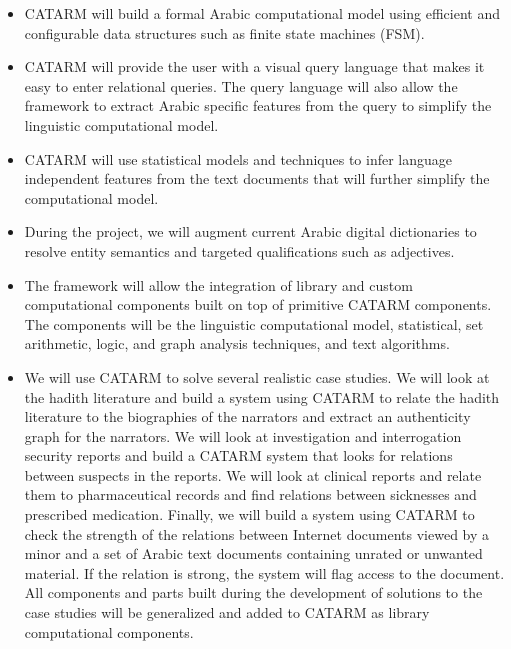 \documentclass[12pt]{article}
\begin{document}
{\begin{itemize}\itemsep0pt
\item CATARM will build a formal Arabic computational model
using efficient and configurable data structures such as 
finite state machines (FSM). 
\item CATARM will provide the user with a visual query 
language that makes it easy to enter relational queries. 
The query language will also allow the framework to extract Arabic
specific features from the query to simplify the linguistic 
computational model. 
\item CATARM will use statistical models and techniques
to infer language independent features from the text documents
that will further simplify the computational model. 
\item During the project, we will augment current Arabic digital 
dictionaries to resolve entity semantics and targeted 
qualifications such as adjectives.
\item The framework will allow the integration of library and 
custom computational components built on top of primitive
CATARM components. 
The components will be the linguistic computational model,
statistical, set arithmetic, logic,
and graph analysis techniques, and  text algorithms.
\item We will use CATARM to solve several realistic case studies.
We will look at the hadith literature and build a system using
CATARM to relate the hadith literature to the biographies of the
narrators and extract an authenticity graph for the narrators.
We will look at investigation and interrogation security reports
and build a CATARM system that looks for relations between suspects
in the reports. 
We will look at clinical reports and relate them to pharmaceutical 
records and find relations between sicknesses and prescribed medication. 
Finally, we will build a system using CATARM to check the strength
of the relations between Internet documents viewed by a minor and
a set of Arabic text documents containing unrated or unwanted 
material. If the relation is strong, the system will flag access to
the document. 
All components and parts built during the development of solutions
to the case studies will be generalized and added to CATARM as 
library computational components. 
\end{itemize}


}
\end{document}
